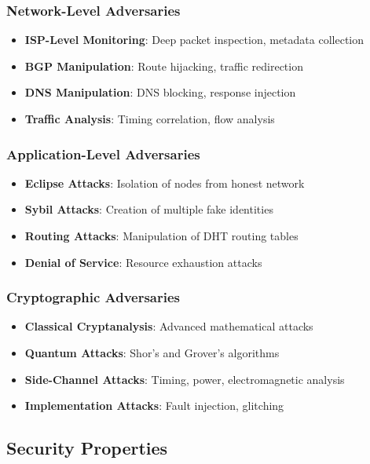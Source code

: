 \documentclass[11pt,a4paper]{article}
\theoremstyle{definition}
\theoremstyle{remark}
\begin{document}
\subsubsection{Network-Level Adversaries}

\begin{itemize}
    \item \textbf{ISP-Level Monitoring}: Deep packet inspection, metadata collection
    \item \textbf{BGP Manipulation}: Route hijacking, traffic redirection
    \item \textbf{DNS Manipulation}: DNS blocking, response injection
    \item \textbf{Traffic Analysis}: Timing correlation, flow analysis
\end{itemize}

\subsubsection{Application-Level Adversaries}

\begin{itemize}
    \item \textbf{Eclipse Attacks}: Isolation of nodes from honest network
    \item \textbf{Sybil Attacks}: Creation of multiple fake identities
    \item \textbf{Routing Attacks}: Manipulation of DHT routing tables
    \item \textbf{Denial of Service}: Resource exhaustion attacks
\end{itemize}

\subsubsection{Cryptographic Adversaries}

\begin{itemize}
    \item \textbf{Classical Cryptanalysis}: Advanced mathematical attacks
    \item \textbf{Quantum Attacks}: Shor's and Grover's algorithms
    \item \textbf{Side-Channel Attacks}: Timing, power, electromagnetic analysis
    \item \textbf{Implementation Attacks}: Fault injection, glitching
\end{itemize}

\subsection{Security Properties}
\end{document}

